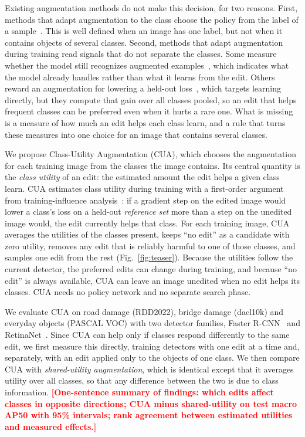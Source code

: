 \documentclass[conference]{IEEEtran}
\newcommand{\todo}[1]{\textcolor{red}{\textbf{[#1]}}}
\begin{document}
Existing augmentation methods do not make this decision, for two reasons. First, methods that adapt augmentation to the class choose the policy from the label of a sample~\cite{yoo2023,cheung2022adaaug,ahn2023cuda}. This is well defined when an image has one label, but not when it contains objects of several classes. Second, methods that adapt augmentation during training read signals that do not separate the classes. Some measure whether the model still recognizes augmented examples~\cite{berthelot2020,ahn2023cuda}, which indicates what the model already handles rather than what it learns from the edit. Others reward an augmentation for lowering a held-out loss~\cite{lu2023bda,liu2021ddas,hou2023madaug}, which targets learning directly, but they compute that gain over all classes pooled, so an edit that helps frequent classes can be preferred even when it hurts a rare one. What is missing is a measure of how much an edit helps each class learn, and a rule that turns these measures into one choice for an image that contains several classes.

We propose Class-Utility Augmentation (CUA), which chooses the augmentation for each training image from the classes the image contains. Its central quantity is the \emph{class utility} of an edit: the estimated amount the edit helps a given class learn. CUA estimates class utility during training with a first-order argument from training-influence analysis~\cite{pruthi2020tracin}: if a gradient step on the edited image would lower a class's loss on a held-out \emph{reference set} more than a step on the unedited image would, the edit currently helps that class. For each training image, CUA averages the utilities of the classes present, keeps ``no edit'' as a candidate with zero utility, removes any edit that is reliably harmful to one of those classes, and samples one edit from the rest (Fig.~\ref{fig:teaser}). Because the utilities follow the current detector, the preferred edits can change during training, and because ``no edit'' is always available, CUA can leave an image unedited when no edit helps its classes. CUA needs no policy network and no separate search phase.

We evaluate CUA on road damage (RDD2022), bridge damage (dacl10k) and everyday objects (PASCAL VOC) with two detector families, Faster R-CNN~\cite{ren2017faster} and RetinaNet~\cite{lin2017focal}. Since CUA can help only if classes respond differently to the same edit, we first measure this directly, training detectors with one edit at a time and, separately, with an edit applied only to the objects of one class. We then compare CUA with \emph{shared-utility augmentation}, which is identical except that it averages utility over all classes, so that any difference between the two is due to class information. \todo{One-sentence summary of findings: which edits affect classes in opposite directions; CUA minus shared-utility on test macro AP50 with 95\% intervals; rank agreement between estimated utilities and measured effects.}
\end{document}
